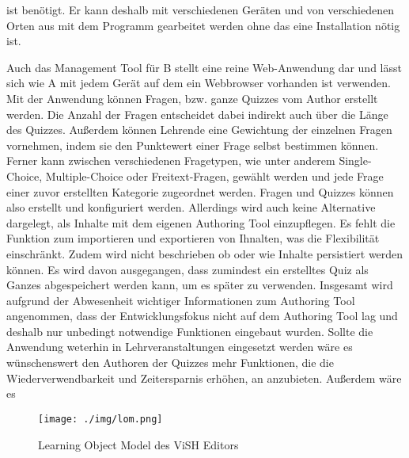 \documentclass[conference]{IEEEtran}
\begin{document}
ist benötigt. Er kann deshalb mit verschiedenen Geräten und von verschiedenen Orten aus mit dem Programm gearbeitet werden ohne das eine Installation nötig ist.

Auch das Management Tool für B stellt eine reine Web-Anwendung dar und lässt sich wie A mit jedem Gerät auf dem ein Webbrowser vorhanden ist verwenden. Mit der Anwendung können Fragen, bzw. ganze Quizzes vom Author erstellt werden. Die Anzahl der Fragen entscheidet dabei indirekt auch über die Länge des Quizzes. Außerdem können Lehrende eine Gewichtung der einzelnen Fragen vornehmen, indem sie den Punktewert einer Frage selbst bestimmen können. Ferner kann zwischen verschiedenen Fragetypen, wie unter anderem Single-Choice, Multiple-Choice oder Freitext-Fragen, gewählt werden und jede Frage einer zuvor erstellten Kategorie zugeordnet werden. Fragen und Quizzes können also erstellt und konfiguriert werden. Allerdings wird auch keine Alternative dargelegt, als Inhalte mit dem eigenen Authoring Tool einzupflegen. Es fehlt die Funktion zum importieren und exportieren von Ihnalten, was die Flexibilität einschränkt. Zudem wird nicht beschrieben ob oder wie Inhalte persistiert werden können. Es wird davon ausgegangen, dass zumindest ein erstelltes Quiz als Ganzes abgespeichert werden kann, um es später zu verwenden. Insgesamt wird aufgrund der Abwesenheit wichtiger Informationen zum Authoring Tool angenommen, dass der Entwicklungsfokus nicht auf dem Authoring Tool lag und deshalb nur unbedingt notwendige Funktionen eingebaut wurden. Sollte die Anwendung weterhin in Lehrveranstaltungen eingesetzt werden wäre es wünschenswert den Authoren der Quizzes mehr Funktionen, die die Wiederverwendbarkeit und Zeitersparnis erhöhen, an anzubieten. Außerdem wäre es 

\begin{figure}[htbp]
\centerline{\texttt{[image: ./img/lom.png]}}
\caption{Learning Object Model des ViSH Editors \cite[p. 3]{Gordillo2015}}
\label{lom}
\end{figure}
\end{document}
